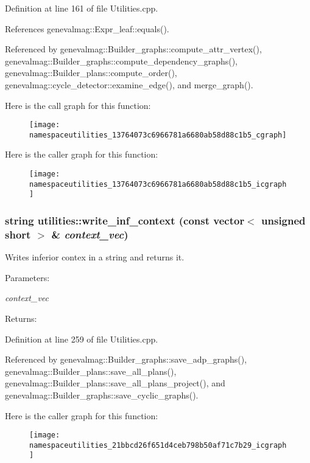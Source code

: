 Definition at line 161 of file Utilities.cpp.

References genevalmag::Expr\_\-leaf::equals().

Referenced by genevalmag::Builder\_\-graphs::compute\_\-attr\_\-vertex(), genevalmag::Builder\_\-graphs::compute\_\-dependency\_\-graphs(), genevalmag::Builder\_\-plans::compute\_\-order(), genevalmag::cycle\_\-detector::examine\_\-edge(), and merge\_\-graph().

Here is the call graph for this function:\nopagebreak
\begin{figure}[H]
\begin{center}
\leavevmode
\texttt{[image: namespaceutilities\_13764073c6966781a6680ab58d88c1b5\_cgraph]}
\end{center}
\end{figure}


Here is the caller graph for this function:\nopagebreak
\begin{figure}[H]
\begin{center}
\leavevmode
\texttt{[image: namespaceutilities\_13764073c6966781a6680ab58d88c1b5\_icgraph]}
\end{center}
\end{figure}
\hypertarget{namespaceutilities_21bbcd26f651d4ceb798b50af71c7b29}{
\subsubsection[{write\_\-inf\_\-context}]{\setlength{\rightskip}{0pt plus 5cm}string utilities::write\_\-inf\_\-context (const vector$<$ unsigned short $>$ \& {\em context\_\-vec})}}
\label{namespaceutilities_21bbcd26f651d4ceb798b50af71c7b29}


Writes inferior contex in a string and returns it. \begin{Desc}
\item[Parameters:]
\begin{description}
\item[{\em context\_\-vec}]\end{description}
\end{Desc}
\begin{Desc}
\item[Returns:]\end{Desc}


Definition at line 259 of file Utilities.cpp.

Referenced by genevalmag::Builder\_\-graphs::save\_\-adp\_\-graphs(), genevalmag::Builder\_\-plans::save\_\-all\_\-plans(), genevalmag::Builder\_\-plans::save\_\-all\_\-plans\_\-project(), and genevalmag::Builder\_\-graphs::save\_\-cyclic\_\-graphs().

Here is the caller graph for this function:\nopagebreak
\begin{figure}[H]
\begin{center}
\leavevmode
\texttt{[image: namespaceutilities\_21bbcd26f651d4ceb798b50af71c7b29\_icgraph]}
\end{center}
\end{figure}
